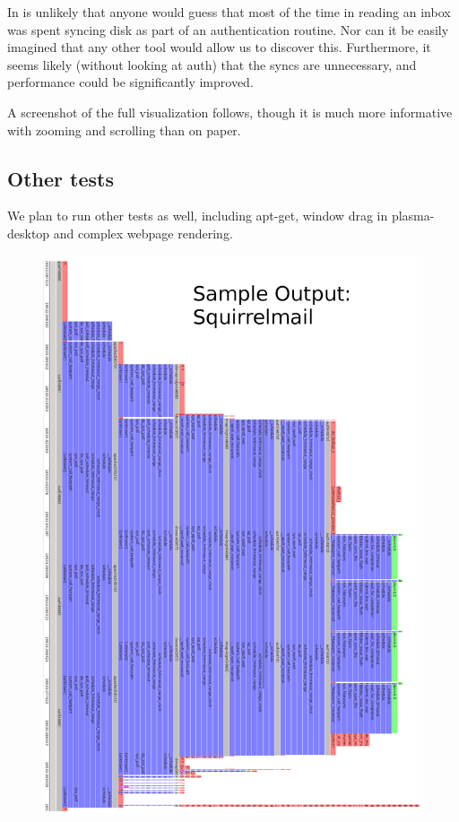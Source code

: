 \documentclass{article}
\begin{document}
In is unlikely that anyone would guess that most of the time in reading an inbox was spent syncing disk as part of an authentication routine.  Nor can it be easily imagined that any other tool would allow us to discover this.  Furthermore, it seems likely (without looking at auth) that the syncs are unnecessary, and performance could be significantly improved.

A screenshot of the full visualization follows, though it is much more informative with zooming and scrolling than on paper.

\subsection{Other tests}

We plan to run other tests as well, including apt-get, window drag in plasma-desktop and complex webpage rendering.

\newpage


\begin{figure}
\includegraphics[width=6in]{squirrelmail}
\end{figure}
\end{document}
